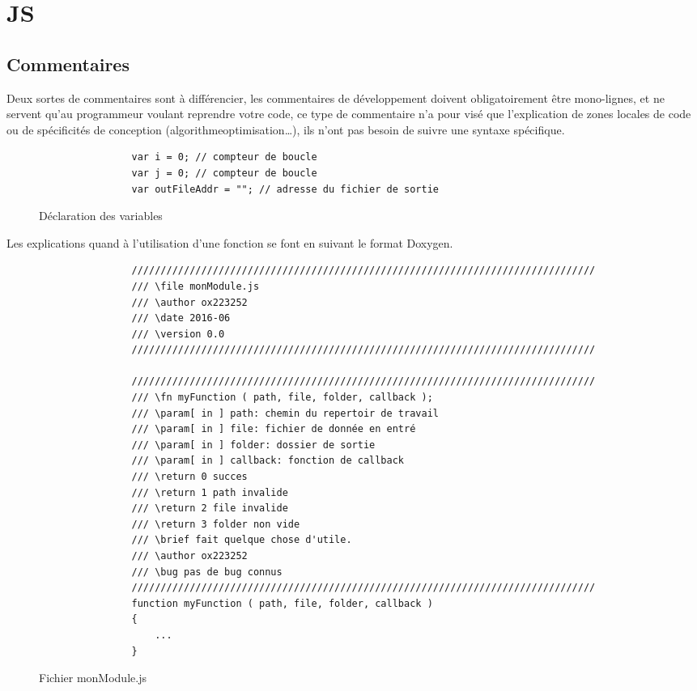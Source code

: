 
\chapter{JS}
	\section{Commentaires}
		Deux sortes de commentaires sont à différencier, les commentaires de développement doivent obligatoirement être mono-lignes, et ne servent qu'au programmeur voulant reprendre votre code, ce type de commentaire n'a pour visé que l'explication de zones locales de code ou de spécificités de conception (algorithme\/optimisation\/\dots), ils n'ont pas besoin de suivre une syntaxe spécifique. 

		\begin{figure}[H]
			\begin{changemargin}{-2.5cm}{-2.5cm}
			\begin{tcolorbox}
			\begin{verbatim}
				var i = 0; // compteur de boucle
				var j = 0; // compteur de boucle
				var outFileAddr = ""; // adresse du fichier de sortie
			\end{verbatim}
			\end{tcolorbox}
			\end{changemargin}
			\caption{Déclaration des variables}
		\end{figure}

		Les explications quand à l'utilisation d'une fonction se font en suivant le format Doxygen.

		\begin{figure}[H]
			\begin{changemargin}{-2.5cm}{-2.5cm}
			\begin{tcolorbox}
			\begin{verbatim}
				////////////////////////////////////////////////////////////////////////////////
				/// \file monModule.js
				/// \author ox223252
				/// \date 2016-06
				/// \version 0.0
				////////////////////////////////////////////////////////////////////////////////

				////////////////////////////////////////////////////////////////////////////////
				/// \fn myFunction ( path, file, folder, callback );
				/// \param[ in ] path: chemin du repertoir de travail
				/// \param[ in ] file: fichier de donnée en entré
				/// \param[ in ] folder: dossier de sortie
				/// \param[ in ] callback: fonction de callback
				/// \return 0 succes
				/// \return 1 path invalide
				/// \return 2 file invalide
				/// \return 3 folder non vide
				/// \brief fait quelque chose d'utile.
				/// \author ox223252
				/// \bug pas de bug connus
				////////////////////////////////////////////////////////////////////////////////
				function myFunction ( path, file, folder, callback )
				{
				    ...
				}
			\end{verbatim}
			\end{tcolorbox}
			\end{changemargin}
			\caption{Fichier monModule.js}
		\end{figure}
	
